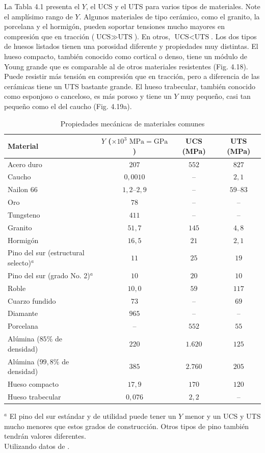 \documentclass[12pt]{book}
\begin{document}
La Tabla 4.1 presenta el $Y$, el UCS y el UTS para varios tipos de materiales. Note el amplísimo rango de $Y$. Algunos materiales de tipo cerámico, como el granito, la porcelana y el hormigón, pueden soportar tensiones mucho mayores en compresión que en tracción ($\text{UCS} \gg \text{UTS}$). En otros, $\text{UCS} < \text{UTS}$. Los dos tipos de huesos listados tienen una porosidad diferente y propiedades muy distintas. El hueso compacto, también conocido como cortical o denso, tiene un módulo de Young grande que es comparable al de otros materiales resistentes (Fig. 4.18). Puede resistir más tensión en compresión que en tracción, pero a diferencia de las cerámicas tiene un UTS bastante grande. El hueso trabecular, también conocido como esponjoso o canceloso, es más poroso y tiene un $Y$ muy pequeño, casi tan pequeño como el del caucho (Fig. 4.19a).

\begin{table}[htbp]
\centering
\caption{Propiedades mecánicas de materiales comunes}
\label{tab:41}
\begin{tabularx}{\textwidth}{Xccc}
\toprule
\textbf{Material} & \textbf{$Y$ ($\times 10^3\text{ MPa} = \text{GPa}$)} & \textbf{UCS (MPa)} & \textbf{UTS (MPa)} \\
\midrule
Acero duro & $207$ & $552$ & $827$ \\
Caucho & $0,0010$ & -- & $2,1$ \\
Nailon 66 & $1,2\text{--}2,9$ & -- & $59\text{--}83$ \\
Oro & $78$ & -- & -- \\
Tungsteno & $411$ & -- & -- \\
Granito & $51,7$ & $145$ & $4,8$ \\
Hormigón & $16,5$ & $21$ & $2,1$ \\
Pino del sur (estructural selecto)$^a$ & $11$ & $25$ & $19$ \\
Pino del sur (grado No. 2)$^a$ & $10$ & $20$ & $10$ \\
Roble & $10,0$ & $59$ & $117$ \\
Cuarzo fundido & $73$ & -- & $69$ \\
Diamante & $965$ & -- & -- \\
Porcelana & -- & $552$ & $55$ \\
Alúmina ($85\%$ de densidad) & $220$ & $1.620$ & $125$ \\
Alúmina ($99,8\%$ de densidad) & $385$ & $2.760$ & $205$ \\
Hueso compacto & $17,9$ & $170$ & $120$ \\
Hueso trabecular & $0,076$ & $2,2$ & -- \\
\bottomrule
\end{tabularx}
\begin{flushleft}
    \small $^a$ El pino del sur estándar y de utilidad puede tener un $Y$ menor y un UCS y UTS mucho menores que estos grados de construcción. Otros tipos de pino también tendrán valores diferentes. \\
    Utilizando datos de \cite{10,29,31,74}.
\end{flushleft}
\end{table}
\end{document}
